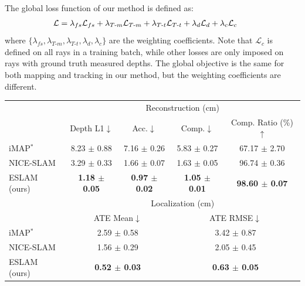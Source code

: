 The global loss function of our method is defined as:
\begin{align}
	\hspace{-0.75em} \mathcal{L} &= \lambda_{fs}\mathcal{L}_{fs} + \lambda_{T\text{-}m}\mathcal{L}_{T\text{-}m} + \lambda_{T\text{-}t}\mathcal{L}_{T\text{-}t} + \lambda_{d}\mathcal{L}_{d} + \lambda_{c}\mathcal{L}_{c}
\end{align}
where $\{\lambda_{fs}, \lambda_{T\text{-}m}, \lambda_{T\text{-}t}, \lambda_{d}, \lambda_{c}\}$ are the weighting coefficients. Note that $\mathcal{L}_{c}$ is defined on all rays in a training batch, while other losses are only imposed on rays with ground truth measured depths. The global objective is the same for both mapping and tracking in our method, but the weighting coefficients are different.

\begin{table}[t]
    \begin{center}
        \begin{tabular}{l|cccc}
            \Xhline{2\arrayrulewidth}
            \multirow{3}{*}{Method} & \multicolumn{4}{c}{\multirow{2}{*}{Reconstruction (cm)}} \\
            \\
            & Depth L1$\downarrow$ & Acc.$\downarrow$ & Comp.$\downarrow$ & Comp. Ratio (\%)$\uparrow$ \\
            
            \hline
            iMAP$^{*}$ & 8.23 $\pm$ 0.88 & 7.16 $\pm$ 0.26 & 5.83 $\pm$ 0.27 & 67.17 $\pm$ 2.70 \\
            NICE-SLAM & 3.29 $\pm$ 0.33 & 1.66 $\pm$ 0.07 & 1.63 $\pm$ 0.05 & 96.74 $\pm$ 0.36 \\
            ESLAM (ours) & \textbf{1.18 $\pm$ 0.05} & \textbf{0.97 $\pm$ 0.02} & \textbf{1.05 $\pm$ 0.01} & \textbf{98.60 $\pm$ 0.07} \\

            \cline{2-5}
            & \multicolumn{4}{c}{\multirow{2}{*}{Localization (cm)}} \\
            \\
            & \multicolumn{2}{c}{ATE Mean$\downarrow$} & \multicolumn{2}{c}{ATE RMSE$\downarrow$} \\
            \cline{2-5}
            iMAP$^{*}$ & \multicolumn{2}{c}{2.59 $\pm$ 0.58} & \multicolumn{2}{c}{3.42 $\pm$ 0.87} \\
            NICE-SLAM & \multicolumn{2}{c}{1.56 $\pm$ 0.29} & \multicolumn{2}{c}{2.05 $\pm$ 0.45} \\
            ESLAM (ours) & \multicolumn{2}{c}{\textbf{0.52 $\pm$ 0.03}} & \multicolumn{2}{c}{\textbf{0.63 $\pm$ 0.05}} \\
            

\end{tabular}
\end{center}
\end{table}
